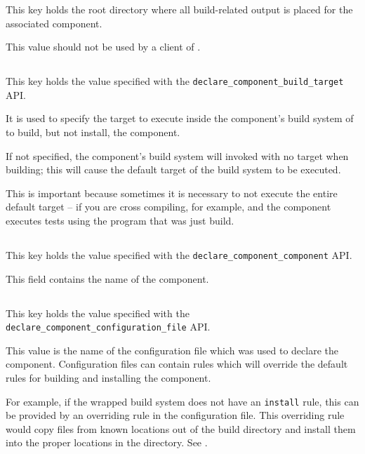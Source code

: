 This key holds the root directory where all build-related output is
placed for the associated component.

This value should not be used by a client of \lmsbw.

\subsection{}

This key holds the value specified with the
\texttt{declare\_component\_build\_target} API.

It is used to specify the target to execute inside the component's
build system of to build, but not install, the component.

If not specified, the component's build system will invoked with no
target when building; this will cause the default target of the build
system to be executed.

This is important because sometimes it is necessary to not execute the
entire default target -- if you are cross compiling, for example, and
the component executes tests using the program that was just build.

\subsection{}

This key holds the value specified with the
\texttt{declare\_component\_component} API.

This field contains the name of the component.

\subsection{}

This key holds the value specified with the
\texttt{declare\_component\_configuration\_file} API.

This value is the name of the configuration file which was used to
declare the component.  Configuration files can contain \makefile
rules which will override the default rules for building and
installing the component.

For example, if the wrapped build system does not have an
\texttt{install} rule, this can be provided by an overriding rule in
the configuration file.  This overriding rule would copy files from
known locations out of the build directory and install them into the
proper locations in the \destdir directory.  See
.

